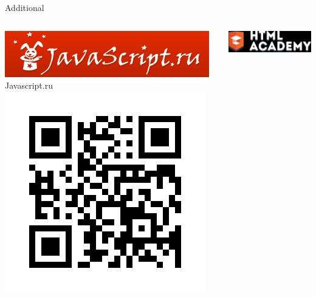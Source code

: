 \begin{frame}{Additional}
    \begin{columns}[t] %
         \begin{column}[T]{5cm} %
            \begin{center}
              \includegraphics[width=\textwidth]{sources/images/javascript_logo.png} \newline
              Javascript.ru \newline
              \includegraphics[width=\textwidth]{sources/images/avascript.png}
            \end{center}
         \end{column}
         \begin{column}[T]{5cm} %
            \begin{center}
              \includegraphics[width=\textwidth]{sources/images/html_academy_logo.png}  \newline

\end{center}
\end{column}
\end{columns}
\end{frame}
